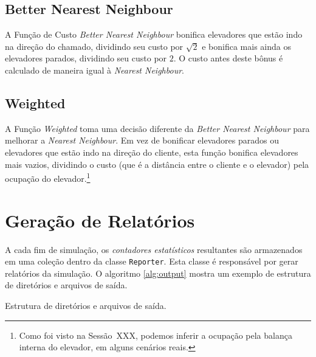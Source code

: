 
\subsection{\label{model:costfunctions:bnn}Better Nearest Neighbour}
A Função de Custo \textit{Better Nearest Neighbour} bonifica elevadores que
estão indo na direção do chamado, dividindo seu custo por $\sqrt 2$ e bonifica
mais ainda os elevadores parados, dividindo seu custo por $2$. O custo antes
deste bônus é calculado de maneira igual à \textit{Nearest Neighbour}.

\subsection{\label{model:costfunctions:weighted}Weighted}
A Função \textit{Weighted} toma uma decisão diferente da \textit{Better Nearest
  Neighbour} para melhorar a \textit{Nearest Neighbour}. Em vez de bonificar
elevadores parados ou elevadores que estão indo na direção do cliente, esta
função bonifica elevadores mais vazios, dividindo o custo (que é a distância
entre o cliente e o elevador) pela ocupação do elevador.\footnote{Como foi visto
na Sessão~XXX, podemos inferir a ocupação pela balança interna do elevador, em
alguns cenários reais.}

\section{Geração de Relatórios} \label{model:report}

A cada fim de simulação, os \textit{contadores estatísticos} resultantes são
armazenados em uma coleção dentro da classe \texttt{Reporter}. Esta classe é
responsável por gerar relatórios da simulação. O algoritmo \ref{alg:output}
mostra um exemplo de estrutura de diretórios e arquivos de saída.

\begin{algorithm}[H]
\caption
   {\label{alg:output}Estrutura de diretórios e arquivos de saída.}
\end{algorithm}

